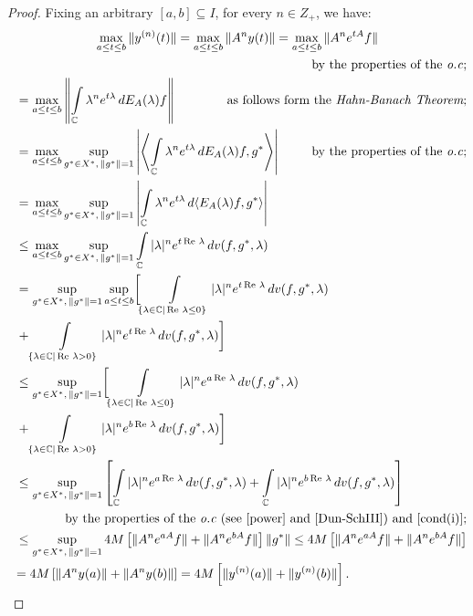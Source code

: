 \documentclass{amsart}
\theoremstyle{plain}
\theoremstyle{definition}
\begin{document}
\begin{proof}
Fixing an arbitrary $[a,b]\subseteq I$, for every $n\in Z_+$, we have:
\begin{multline*}
\max_{a\le t\le b}\|y^{(n)}(t)\|=\max_{a\le t\le b}\|A^ny(t)\|=
\max_{a\le t\le b}\|A^ne^{tA}f\|
\\
\hfill
\text{by the properties of the \textit{o.c};}
\\
\shoveleft{
=\max_{a\le t\le b}
\left\|\int\limits_{{\mathbb C}} \lambda ^n e^{t\lambda}\,d E_A(\lambda)f\right\|
\hfill
\text{as follows form the {\it Hahn-Banach Theorem};}
}\\
\shoveleft{
=\max_{a\le t\le b}
\sup_{g^*\in X^*,\,\|g^*\|=1}
\left|\left\langle
\int\limits_{{\mathbb C}} \lambda ^n e^{t\lambda}\,dE_A(\lambda)f,g^*
\right\rangle\right|
\hfill
\text{by the properties of the \textit{o.c};}
}\\
\shoveleft{
=\max_{a\le t\le b}
\sup_{g^*\in X^*,\,\|g^*\|=1}
\left|
\int\limits_{{\mathbb C}} \lambda ^n e^{t\lambda}\,d
\langle 
E_A(\lambda)f,g^*
\rangle\right|
}\\
\shoveleft{
\le \max_{a\le t\le b}
\sup_{g^*\in X^*,\,\|g^*\|=1}
\int\limits_{{\mathbb C}} |\lambda|^n e^{t\operatorname{Re\,}\lambda}\,dv(f,g^*,\lambda)
}\\
\shoveleft{
=\sup_{g^*\in X^*,\,\|g^*\|=1}
\sup_{a\le t\le b}
\biggl[\int\limits_{\{\lambda\in{{\mathbb C}}|\operatorname{Re\,}\lambda\le 0\}}|\lambda|^{n}e^{t\operatorname{Re\,}\lambda}\,dv(f,g^*,\lambda)
}\\
\shoveleft{
+\int\limits_{\{\lambda\in{{\mathbb C}}|\operatorname{Re\,}\lambda>0\}}|\lambda|^{n}e^{t\operatorname{Re\,}\lambda}\,dv(f,g^*,\lambda)
\biggr]
}\\
\shoveleft{
\le \sup_{g^*\in X^*,\,\|g^*\|=1}
\biggl[\int\limits_{\{\lambda\in{{\mathbb C}}|\operatorname{Re\,}\lambda\le 0\}}|\lambda|^{n}e^{a\operatorname{Re\,}\lambda}\,dv(f,g^*,\lambda)
}\\
\shoveleft{
+\int\limits_{\{\lambda\in{{\mathbb C}}|\operatorname{Re\,}\lambda>0\}}|\lambda|^{n}e^{b\operatorname{Re\,}\lambda}\,dv(f,g^*,\lambda)
\biggr]
}\\
\shoveleft{
\le \sup_{g^*\in X^*,\,\|g^*\|=1}
\left[\int\limits_{{\mathbb C}}|\lambda|^{n}e^{a\operatorname{Re\,}\lambda}\,dv(f,g^*,\lambda)
+\int\limits_{{\mathbb C}} |\lambda|^{n}e^{b\operatorname{Re\,}\lambda}\,dv(f,g^*,\lambda)
\right]
}\\
\hfill
\text{by the properties of the \textit{o.c} 
(see \eqref{power} and {\cite[Theorem XVIII.$2.11$ (f)]{Dun-SchIII}})
and \eqref{cond(i)};}
\\
\shoveleft{
\le \sup_{g^*\in X^*,\,\|g^*\|=1}
4M\left[\|A^ne^{aA}f\|+\|A^ne^{bA}f\|\right]\|g^*\|
\le 4M\left[\|A^ne^{aA}f\|+\|A^ne^{bA}f\|\right]
}\\
\ \
=4M\left[\|A^ny(a)\|+\|A^ny(b)\|\right]
=4M\left[\|y^{(n)}(a)\|+\|y^{(n)}(b)\|\right].
\hfill
\end{multline*}


\end{proof}
\end{document}
